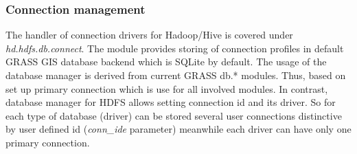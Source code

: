 \documentclass[a4paper,12pt,oneside]{report}
\begin{document}
	
	
    \subsubsection{Connection management} 
    The handler of connection drivers for Hadoop/Hive is covered under
    \textit{hd.hdfs.db.connect}. The module provides storing of connection profiles in
    default GRASS GIS database backend which is SQLite  by default. The usage of 
    the database manager is derived from current GRASS db.* modules.
    Thus, based on set up primary connection which is use for all involved modules.
    In contrast, database manager for HDFS allows setting
    connection id and its driver. So for each type of database (driver) can be
    stored several user connections distinctive by user defined id (\textit{conn\_ide}
    parameter) meanwhile  each driver can have only one primary connection.
	
\end{document}
